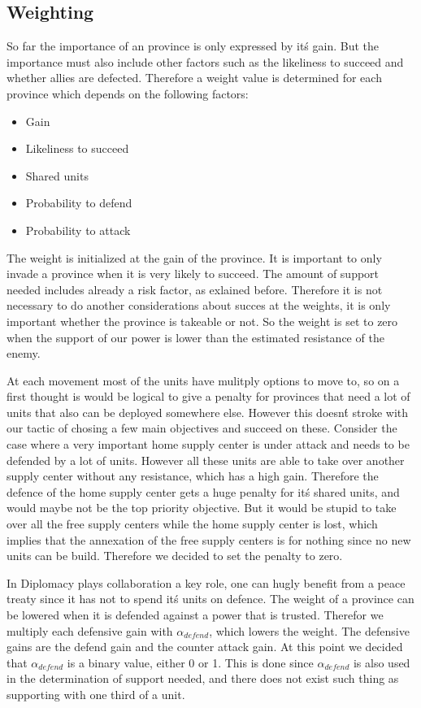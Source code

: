 \documentclass[a4paper]{article} %
\begin{document}
\subsection{Weighting}
So far the importance of an province is only expressed by it\'s gain. But the importance must also include other factors such as the likeliness to succeed and whether allies are defected. Therefore a weight value is determined for each province which depends on the following factors:

\begin{itemize}
\item Gain
\item Likeliness to succeed
\item Shared units
\item Probability to defend
\item Probability to attack
\end{itemize}

The weight is initialized at the gain of the province. It is important to only invade a province when it is very likely to succeed. The amount of support needed includes already a risk factor, as exlained before. Therefore it is not necessary to do another considerations about succes at the weights, it is only important whether the province is takeable or not. So the weight is set to zero when the support of our power is lower than the estimated resistance of the enemy.

At each movement most of the units have mulitply options to move to, so on a first thought is would be logical to give a penalty for provinces that need a lot of units that also can be deployed somewhere else. However this doesn\'t stroke with our tactic of chosing a few main objectives and succeed on these. Consider the case where a very important home supply center is under attack and needs to be defended by a lot of units. However all these units are able to take over another supply center without any resistance, which has a high gain. Therefore the defence of the home supply center gets a huge penalty for it\'s shared units, and would maybe not be the top priority objective. But it would be stupid to take over all the free supply centers while the home supply center is lost, which implies that the annexation of the free supply centers is for nothing since no new units can be build. Therefore we decided to set the penalty to zero. 

In Diplomacy plays collaboration a key role, one can hugly benefit from a peace treaty since it has not to spend it\'s units on defence. The weight of a province can be lowered when it is defended against a power that is trusted. Therefor we multiply each defensive gain with $\alpha_{defend}$, which lowers the weight. The defensive gains are the defend gain and the counter attack gain. At this point we decided that $\alpha_{defend}$ is a binary value, either 0 or 1. This is done since $\alpha_{defend}$ is also used in the determination of support needed, and there does not exist such thing as supporting with one third of a unit. 
\end{document}
